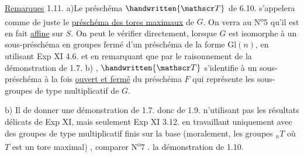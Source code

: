 
\uline{Remarques} 1.11. a)Le préschéma $\handwritten{\mathscr T}$ de 6.10. s'appelera comme de juste le \uline{préschéma des tores maximaux} de $G$. On verra au N\textsuperscript{o}5 qu'il est en fait \uline{affine} sur $S$. On peut le vérifier directement, lorsque $G$ est isomorphe à un sous-préschéma en groupes fermé d'un préschéma de la forme $\mathrm{Gl}(n)$, en utilisant Exp XI 4.6. et en remarquant que par le raisonnement de la démonstration de 1.7. b) , $\handwritten{\mathscr T}$ s'identifie à un sous-préschéma à la fois \uline{ouvert et fermé} du préschéma $F$ qui représente les sous-groupes de type multiplicatif de $G$.


b) Il   de donner une démonstration de 1.7. donc de 1.9. n'utilisant pas les résultats délicats de Exp XI, mais seulement  Exp XI 3.12.  en travaillant uniquement avec des groupes de type multiplicatif finis sur la base (moralement, les groupes ${}_nT$ où $T$ est un tore maximal) , comparer  N\textsuperscript{o}7 .   la démonstration de 1.10.\handwritten{,}





